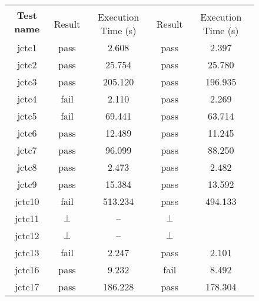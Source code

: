 \begin{figure}[t]
\begin{center}
  \begin{tabularx}{0.9\textwidth}{c||c|c|c|c}
    \multirow{2}{*}{\bf Test name} & \multicolumn{2}{c|}{\PwT{}} & \multicolumn{2}{c}{\PwTc{}} \\
    \cline{2-5}
                                   & Result & Execution Time (s)  & Result & Execution Time (s)  \\
    \cline{1-5}
    jctc1                          & pass   & 2.608               & pass   & 2.397 \\
    jctc2                          & pass   & 25.754              & pass   & 25.780 \\
    jctc3                          & pass   & 205.120             & pass   & 196.935 \\
    jctc4                          & fail   & 2.110               & pass   & 2.269 \\
    jctc5                          & fail   & 69.441              & pass   & 63.714 \\
    jctc6                          & pass   & 12.489              & pass   & 11.245 \\
    jctc7                          & pass   & 96.099              & pass   & 88.250 \\
    jctc8                          & pass   & 2.473               & pass   & 2.482 \\
    jctc9                          & pass   & 15.384              & pass   & 13.592 \\
    jctc10                         & fail   & 513.234             & pass   & 494.133 \\
    jctc11                         & $\bot$ & --                  & $\bot$ & \\
    jctc12                         & $\bot$ & --                  & $\bot$ & \\
    jctc13                         & fail   & 2.247               & pass   & 2.101 \\
    jctc16                         & pass   & 9.232               & fail   & 8.492 \\
    jctc17                         & pass   & 186.228             & pass   & 178.304 \\

\end{tabularx}
\end{center}
\end{figure}
